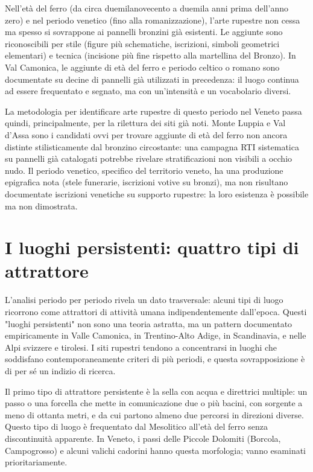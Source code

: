 Nell'età del ferro (da circa duemilanovecento a duemila anni prima dell'anno zero) e nel periodo venetico (fino alla romanizzazione), l'arte rupestre non cessa ma spesso si sovrappone ai pannelli bronzini già esistenti. Le aggiunte sono riconoscibili per stile (figure più schematiche, iscrizioni, simboli geometrici elementari) e tecnica (incisione più fine rispetto alla martellina del Bronzo). In Val Camonica, le aggiunte di età del ferro e periodo celtico o romano sono documentate su decine di pannelli già utilizzati in precedenza: il luogo continua ad essere frequentato e segnato, ma con un'intensità e un vocabolario diversi.

La metodologia per identificare arte rupestre di questo periodo nel Veneto passa quindi, principalmente, per la rilettura dei siti già noti. Monte Luppia e Val d'Assa sono i candidati ovvi per trovare aggiunte di età del ferro non ancora distinte stilisticamente dal bronzino circostante: una campagna RTI sistematica su pannelli già catalogati potrebbe rivelare stratificazioni non visibili a occhio nudo. Il periodo venetico, specifico del territorio veneto, ha una produzione epigrafica nota (stele funerarie, iscrizioni votive su bronzi), ma non risultano documentate iscrizioni venetiche su supporto rupestre: la loro esistenza è possibile ma non dimostrata.

\section{I luoghi persistenti: quattro tipi di attrattore}

L'analisi periodo per periodo rivela un dato trasversale: alcuni tipi di luogo ricorrono come attrattori di attività umana indipendentemente dall'epoca. Questi "luoghi persistenti" non sono una teoria astratta, ma un pattern documentato empiricamente in Valle Camonica, in Trentino-Alto Adige, in Scandinavia, e nelle Alpi svizzere e tirolesi. I siti rupestri tendono a concentrarsi in luoghi che soddisfano contemporaneamente criteri di più periodi, e questa sovrapposizione è di per sé un indizio di ricerca.

Il primo tipo di attrattore persistente è la sella con acqua e direttrici multiple: un passo o una forcella che mette in comunicazione due o più bacini, con sorgente a meno di ottanta metri, e da cui partono almeno due percorsi in direzioni diverse. Questo tipo di luogo è frequentato dal Mesolitico all'età del ferro senza discontinuità apparente. In Veneto, i passi delle Piccole Dolomiti (Borcola, Campogrosso) e alcuni valichi cadorini hanno questa morfologia; vanno esaminati prioritariamente.

